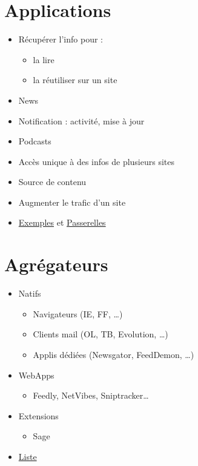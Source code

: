 \hypertarget{applications}{%
\section{Applications}\label{applications}}

\begin{itemize}
\tightlist
\item
  Récupérer l'info pour :

  \begin{itemize}
  \tightlist
  \item
    la lire
  \item
    la réutiliser sur un site
  \end{itemize}
\item
  News
\item
  Notification : activité, mise à jour
\item
  Podcasts
\item
  Accès unique à des infos de plusieurs sites
\item
  Source de contenu
\item
  Augmenter le trafic d'un site
\item
  \href{http://blog.louisgray.com/2008/11/30-different-uses-for-rss.html}{Exemples}
  et
  \href{http://www.makeuseof.com/tag/14-other-ways-to-use-rss-feeds/}{Passerelles}
\end{itemize}

\hypertarget{agruxe9gateurs}{%
\section{Agrégateurs}\label{agruxe9gateurs}}

\begin{itemize}
\tightlist
\item
  Natifs

  \begin{itemize}
  \tightlist
  \item
    Navigateurs (IE, FF, \ldots{})
  \item
    Clients mail (OL, TB, Evolution, \ldots{})
  \item
    Applis dédiées (Newsgator, FeedDemon, \ldots{})
  \end{itemize}
\item
  WebApps

  \begin{itemize}
  \tightlist
  \item
    Feedly, NetVibes, Sniptracker\ldots{}
  \end{itemize}
\item
  Extensions

  \begin{itemize}
  \tightlist
  \item
    Sage
  \end{itemize}
\item
  \href{https://en.wikipedia.org/wiki/Comparison_of_feed_aggregators}{Liste}
\end{itemize}

